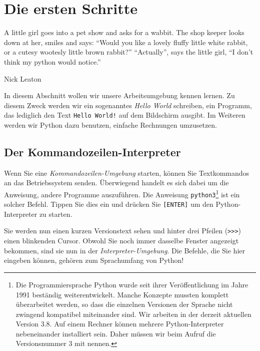 \chapter{Die ersten Schritte}
\epigraph{
	A little girl goes into a pet show and asks for a wabbit. The shop keeper looks down at her, smiles
	and says:\newline
	\enquote{Would you like a lovely fluffy little white rabbit, or a cutesy wootesly little brown rabbit?}\newline
	\enquote{Actually}, says the little girl, \enquote{I don't think my python would notice.}
}{Nick Leaton}

In diesem Abschnitt wollen wir unsere Arbeitsumgebung kennen lernen. Zu diesem Zweck werden wir ein sogenanntes \emph{Hello World} schreiben, \ie ein Programm, das lediglich den Text \texttt{Hello World!} auf dem Bildschirm ausgibt. Im Weiteren werden wir Python dazu benutzen, einfache Rechnungen umzusetzen.



\section{Der Kommandozeilen-Interpreter} \label{sec:Interpreter}
Wenn Sie eine \emph{Kommandozeilen-Umgebung} starten, können Sie Textkommandos an das Betriebssystem senden. Überwiegend handelt es sich dabei um die Anweisung, andere Programme auszuführen. Die Anweisung \texttt{python3}\footnote{Die Programmiersprache Python wurde seit ihrer Veröffentlichung im Jahre 1991 beständig weiterentwickelt. Manche Konzepte mussten komplett überarbeitet werden, so dass die einzelnen Versionen der Sprache nicht zwingend kompatibel miteinander sind. Wir arbeiten in der derzeit aktuellen Version 3.8. Auf einem Rechner können mehrere Python-Interpreter nebeneinander installiert sein. Daher müssen wir beim Aufruf die Versionsnummer 3 mit nennen.} ist ein solcher Befehl. Tippen Sie dies ein und drücken Sie \texttt{[ENTER]} um den Python-Interpreter zu starten.

Sie werden nun einen kurzen Versionstext sehen und hinter drei Pfeilen (\texttt{>{}>{}>}) einen blinkenden Cursor. Obwohl Sie noch immer dasselbe Fenster angezeigt bekommen, sind sie nun in der \emph{Interpreter-Umgebung}. Die Befehle, die Sie hier eingeben können, gehören zum Sprachumfang von Python!


